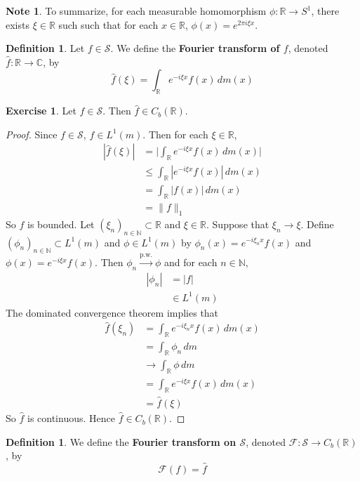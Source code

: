 \documentclass[12pt]{amsart}
\theoremstyle{definition}
\newtheorem{defn}[definition]{Definition}
\newtheorem{note}[definition]{Note}
\newtheorem{ex}[definition]{Exercise}
\newcommand{\C}{\mathbb{C}}
\newcommand{\N}{\mathbb{N}}
\newcommand{\R}{\mathbb{R}}
\newcommand{\MF}{\mathcal{F}}
\newcommand{\MS}{\mathcal{S}}
\newcommand{\dm}{\, d m}
\newcommand{\convt}[1]{\xrightarrow{\text{#1}}}
\begin{document}
	\begin{note}
		To summarize, for each measurable homomorphism $\phi:\R \rightarrow S^1$, there exists $\xi \in \R$ such  such that for each $x \in \R$, $\phi(x) = e^{2 \pi i  \xi x}$. 
	\end{note}
	
	\begin{defn}
		Let $f \in \MS$. We define the \textbf{Fourier transform of $f$}, denoted $\hat{f} : \R \rightarrow \C$, by $$ \hat{f}(\xi) = \int_{\R} e^{-i \xi x}f(x) \, dm(x)$$ 
	\end{defn}

	\begin{ex}
		Let $f \in \MS$. Then $\hat{f} \in C_b(\R)$.
	\end{ex}

	\begin{proof}
		Since $f \in \MS$, $f \in L^1(m)$. Then for each $\xi \in \R$,
		\begin{align*}
			|\hat{f}(\xi)| 
			& = \bigg| \int_{\R} e^{-i\xi x}f(x) \dm(x) \bigg| \\
			& \leq \int_{\R} |e^{-i\xi x}f(x)| \dm(x) \\
			& = \int_{\R} |f(x)| \dm(x) \\
			& = \|f\|_1
		\end{align*}
		So $f$ is bounded. Let $(\xi_n)_{n \in \N} \subset \R$ and $\xi \in \R$. Suppose that $\xi_n \rightarrow \xi$. Define $(\phi_n)_{n \in \N} \subset L^1(m)$ and $\phi \in L^1(m)$ by $\phi_n(x) = e^{-i\xi_n x}f(x)$ and $\phi(x) = e^{-i\xi x}f(x)$. Then $\phi_n \convt{p.w.} \phi$ and for each $n \in \N$, 
		\begin{align*}
			|\phi_n|
			& = |f| \\
			& \in L^1(m)
		\end{align*}
		The dominated convergence theorem implies that 
		\begin{align*}
			\hat{f}(\xi_n)
			& = \int_{\R} e^{-i\xi_n x}f(x) \dm(x) \\
			& = \int_{\R} \phi_n \dm \\
			& \rightarrow \int_{\R} \phi \dm \\
			& = \int_{\R} e^{-i\xi x}f(x) \dm(x) \\
			& = \hat{f}(\xi)
		\end{align*}
		So $\hat{f}$ is continuous. Hence $\hat{f} \in C_b(\R)$.
	\end{proof}

	\begin{defn}
		We define the \textbf{Fourier transform on $\MS$}, denoted $\MF: \MS \rightarrow C_b(\R)$, by 
		$$\MF(f) = \hat{f}$$
	\end{defn}
	
\end{document}
